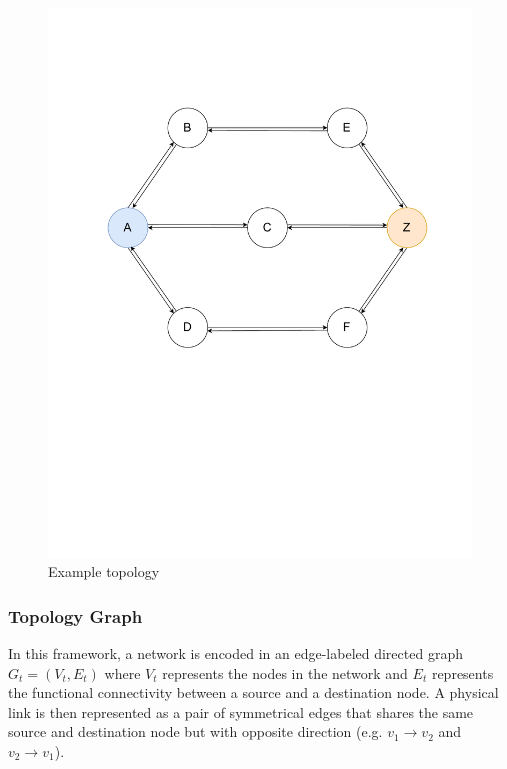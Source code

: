 \documentclass[10pt,sigconf,letterpaper,anonymous,nonacm]{acmart}
\begin{document}
\begin{figure}[h]
    \centering
    \includegraphics[scale=0.4, trim=0cm 11cm 0cm 5cm]{ex.pdf}
    \caption{Example topology}
    \label{fig:ex}
\end{figure}

\subsubsection{Topology Graph}
In this framework, a network is encoded in an edge-labeled directed graph 
$G_t = (V_t, E_t)$ where $V_t$ represents the nodes in the network and 
$E_t$ represents the functional connectivity between a source and a destination node. 
A physical link is then represented as a pair of symmetrical edges that shares the same source 
and destination node but with opposite direction (e.g. $v_1 \rightarrow v_2$ and $v_2 
\rightarrow v_1$).

\end{document}
